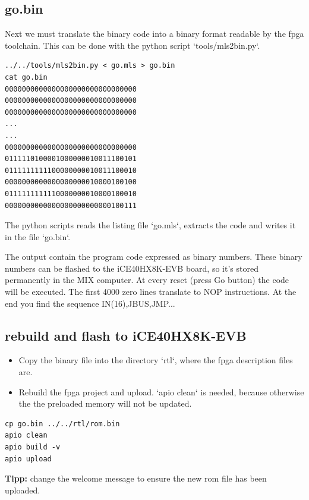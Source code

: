 \documentclass[a4paper,ngerman]{scrartcl}
\begin{document}
\subsection{go.bin}

Next we must translate the binary code into a binary format readable by the fpga toolchain. This can be done with the python script `tools/mls2bin.py`.


\begin{lstlisting}
../../tools/mls2bin.py < go.mls > go.bin
cat go.bin
0000000000000000000000000000000
0000000000000000000000000000000
0000000000000000000000000000000
...
...
0000000000000000000000000000000
0111110100001000000010011100101
0111111111100000000010011100010
0000000000000000000010000100100
0111111111110000000010000100010
0000000000000000000000000100111
\end{lstlisting}

The python scripts reads the listing file `go.mls`, extracts the code and writes it in the file `go.bin`.

The output contain the program code expressed as binary numbers. These binary numbers can be flashed to the iCE40HX8K-EVB board, so it's stored permanently in the MIX computer. At every reset (press Go button) the code will be executed. The first 4000 zero lines translate to NOP instructions. At the end you find the sequence IN(16),JBUS,JMP...

\subsection{rebuild and flash to iCE40HX8K-EVB}

\begin{itemize}
	\item Copy the binary file into the directory `rtl`, where the fpga description files are.
	\item Rebuild the fpga project and upload. `apio clean` is needed, because otherwise the the preloaded memory will not be updated.	
\end{itemize}

\begin{lstlisting}
cp go.bin ../../rtl/rom.bin
apio clean
apio build -v
apio upload
\end{lstlisting}

\textbf{Tipp:} change the welcome message to ensure the new rom file has been uploaded.
\end{document}
